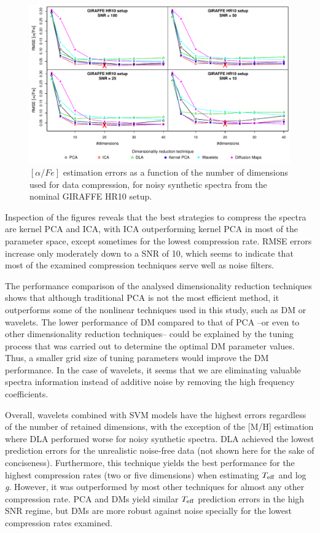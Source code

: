 \documentclass[a4paper,fleqn,usenatbib]{mnras}
\begin{document}
{{{\begin{figure}
\centering\includegraphics[width=\textwidth]{flamesHR10_AlFe_BestSVM_N-RMSE_test.pdf}
\caption{$\left[ \alpha/Fe \right]$  estimation errors as a function of the number of
  dimensions used for data compression, for noisy synthetic
  spectra from the nominal GIRAFFE HR10 setup.}
\label{fig:07}
\end{figure}

Inspection of the figures reveals that the best strategies to compress
the spectra are kernel PCA and ICA, with ICA outperforming kernel PCA
in most of the parameter space, except sometimes for the lowest
compression rate. RMSE errors increase only moderately down to a SNR
of 10, which seems to indicate that most of the examined compression
techniques serve well as noise filters.

The performance comparison of the analysed dimensionality reduction
techniques shows that although traditional PCA is not the most
efficient method, it outperforms some of the nonlinear techniques used
in this study, such as DM or wavelets. %
The lower performance of DM compared to that of PCA --or even to other 
dimensionality reduction techniques-- could be explained by the 
tuning process that was carried out to determine the optimal DM 
parameter values. Thus, a smaller grid size of tuning parameters 
would improve the DM performance.
In the case of wavelets, it seems that we are eliminating valuable 
spectra information instead of additive noise by removing the high 
frequency coefficients. %

Overall, wavelets combined with SVM models have the highest errors
regardless of the number of retained dimensions, with the exception of
the [M/H] estimation where DLA performed worse for noisy synthetic
spectra. DLA achieved the lowest prediction errors for the unrealistic
noise-free data (not shown here for the sake of
conciseness). Furthermore, this technique yields the best performance
for the highest compression rates (two or five dimensions) when
estimating $T_{\rm eff}$ and log \textit{g}. However, it was
outperformed by most other techniques for almost any other compression
rate. PCA and DMs yield similar $T_{\rm eff}$ prediction
errors in the high SNR regime, but DMs are more robust against noise
specially for the lowest compression rates examined.

}}}
\end{document}
